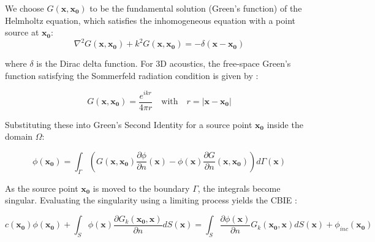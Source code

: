 
We choose $G(\mathbf{x}, \mathbf{x_0})$ to be the fundamental solution (Green's function) of the Helmholtz equation, which satisfies the inhomogeneous equation with a point source at $\mathbf{x_0}$:
\begin{equation}
    \nabla^2 G(\mathbf{x}, \mathbf{x_0}) + k^2 G(\mathbf{x}, \mathbf{x_0}) = -\delta(\mathbf{x} - \mathbf{x_0})
\end{equation}

where $\delta$ is the Dirac delta function. For 3D acoustics, the free-space Green's function satisfying the Sommerfeld radiation condition is given by \cite{kirkupboundaryelementmethod1998}:


\begin{equation}
    G(\mathbf{x}, \mathbf{x_0}) = \frac{e^{ik r}}{4 \pi r} \quad \mbox{with} \quad r = |\mathbf{x} - \mathbf{x_0}|
\end{equation}

Substituting these into Green's Second Identity for a source point $\mathbf{x_0}$ inside the domain $\Omega$:

\begin{equation}
    \phi(\mathbf{x_0}) = \int_{\Gamma} \left( G(\mathbf{x}, \mathbf{x_0}) \frac{\partial \phi}{\partial n}(\mathbf{x}) - \phi(\mathbf{x}) \frac{\partial G}{\partial n}(\mathbf{x}, \mathbf{x_0}) \right) d\Gamma(\mathbf{x})
\end{equation}

As the source point $\mathbf{x_0}$ is moved to the boundary $\Gamma$, the integrals become singular. Evaluating the singularity using a limiting process yields the \ac{CBIE} \cite{marburg2002boundary}:

\begin{equation}
    c(\mathbf{x_0})\phi(\mathbf{x_0}) + \int_S \phi(\mathbf{x}) \frac{\partial G_k(\mathbf{x_0}, \mathbf{x})}{\partial n} dS(\mathbf{x}) = \int_S \frac{\partial \phi(\mathbf{x})}{\partial n} G_k(\mathbf{x_0}, \mathbf{x}) dS(\mathbf{x}) + \phi_{inc}(\mathbf{x_0})
\end{equation}

